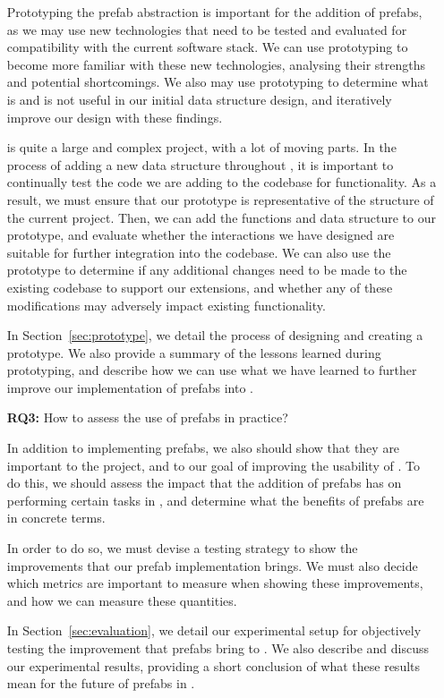 \documentclass[11pt]{article}
\begin{document}
\begin{itemize}
			Prototyping the prefab abstraction is important for the addition of prefabs, as we may use new technologies that need to be tested and evaluated for compatibility with the current \opendc{} software stack.
			We can use prototyping to become more familiar with these new technologies, analysing their strengths and potential shortcomings.
			We also may use prototyping to determine what is and is not useful in our initial data structure design, and iteratively improve our design with these findings.

			\opendc{} is quite a large and complex project, with a lot of moving parts.
			In the process of adding a new data structure throughout \opendc{}, it is important to continually test the code we are adding to the codebase for functionality.
			As a result, we must ensure that our prototype is representative of the structure of the current \opendc{} project.
			Then, we can add the functions and data structure to our prototype, and evaluate whether the interactions we have designed are suitable for further integration into the \opendc{} codebase.
			We can also use the prototype to determine if any additional changes need to be made to the existing codebase to support our extensions, and whether any of these modifications may adversely impact existing functionality.

			In Section~\ref{sec:prototype}, we detail the process of designing and creating a prototype.
			We also provide a summary of the lessons learned during prototyping, and describe how we can use what we have learned to further improve our implementation of prefabs into \opendc{}.
			\item [\textbf{RQ3:}] How to assess the use of prefabs in practice?

			In addition to implementing prefabs, we also should show that they are important to the \opendc{} project, and to our goal of improving the usability of \opendc{}.
			To do this, we should assess the impact that the addition of prefabs has on performing certain tasks in \opendc{}, and determine what the benefits of prefabs are in concrete terms.

			In order to do so, we must devise a testing strategy to show the improvements that our prefab implementation brings.
			We must also decide which metrics are important to measure when showing these improvements, and how we can measure these quantities.

			In Section~\ref{sec:evaluation}, we detail our experimental setup for objectively testing the improvement that prefabs bring to \opendc{}.
			We also describe and discuss our experimental results, providing a short conclusion of what these results mean for the future of prefabs in \opendc{}.
			
		\end{itemize}
	
\end{document}
